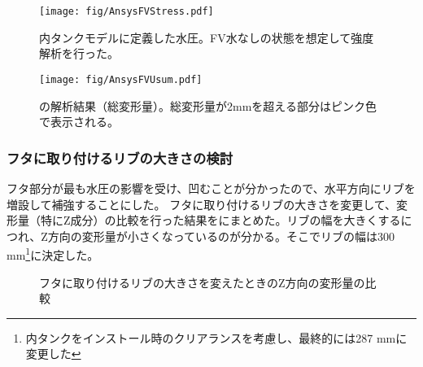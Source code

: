 \begin{figure}[htbp]
\begin{minipage}{0.47\textwidth}
\centering
\texttt{[image: fig/AnsysFVStress.pdf]}
\caption[内タンクモデルに定義した水圧]{内タンクモデルに定義した水圧。FV水なしの状態を想定して強度解析を行った。}
\label{AnsysFVStress}
\end{minipage}
\hfill
\begin{minipage}{0.47\textwidth}
\centering
\texttt{[image: fig/AnsysFVUsum.pdf]}
\caption[の解析結果（総変形量）]{の解析結果（総変形量）。総変形量が2mmを超える部分はピンク色で表示される。}
\label{AnsysFVUsum}
\end{minipage}
\end{figure}

\subsubsection{フタに取り付けるリブの大きさの検討}
フタ部分が最も水圧の影響を受け、凹むことが分かったので、水平方向にリブを増設して補強することにした。
フタに取り付けるリブの大きさを変更して、変形量（特にZ成分）の比較を行った結果をにまとめた。リブの幅を大きくするにつれ、Z方向の変形量が小さくなっているのが分かる。そこでリブの幅は300 mm\footnote{内タンクをインストール時のクリアランスを考慮し、最終的には287 mmに変更した}に決定した。

\begin{figure}[htbp]
  \begin{minipage}{0.47\textwidth}
  \end{minipage}
  \hfill
  \begin{minipage}{0.47\textwidth}
  \end{minipage}
  \hfill
  \begin{minipage}{0.47\textwidth}
  \end{minipage}
  \hfill \begin{minipage}{0.47\textwidth}
  \end{minipage}
  \hfill
  \begin{minipage}{0.47\textwidth}
  \end{minipage}
  \hfill
    \caption{フタに取り付けるリブの大きさを変えたときのZ方向の変形量の比較}
  \label{AnsysFVf}
\end{figure}

